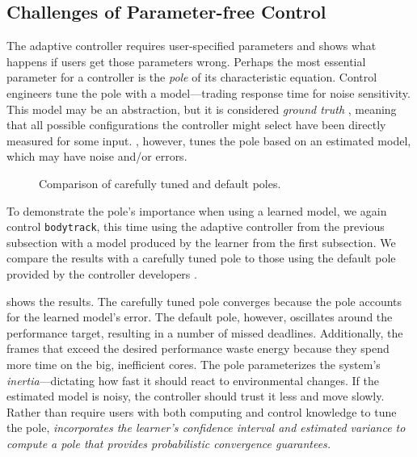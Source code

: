 \subsection{Challenges of Parameter-free Control}
The adaptive controller requires user-specified parameters and
 shows what happens if users get those
parameters wrong. Perhaps the most essential parameter for a
controller is the \emph{pole} of its characteristic equation.  Control
engineers tune the pole with a model---trading response time for noise
sensitivity.  This model may be an abstraction, but it is considered
\emph{ground truth} \cite{Hellerstein2004a}, meaning that all possible
configurations the controller might select have been directly measured
for some input.  \SYSTEM{}, however, tunes the pole based on an
estimated model, which may have noise and/or errors.



\begin{figure}
\centering

\caption{Comparison of carefully tuned and default poles.}
\label{fig:not-simple}
\end{figure}
To demonstrate the pole's importance when using a learned model, we
again control \texttt{bodytrack}, this time using the adaptive
controller from the previous subsection with a model produced by the
learner from the first subsection.  We compare the results with a
carefully tuned pole to those using the default pole provided by the
controller developers \cite{POET}.

 shows the results.  The carefully tuned pole
converges because the pole accounts for the learned model's error. The
default pole, however, oscillates around the performance target,
resulting in a number of missed deadlines.  Additionally, the frames
that exceed the desired performance waste energy because they spend
more time on the big, inefficient cores. The pole parameterizes the
system's \emph{inertia}---dictating how fast it should react to
environmental changes.  If the estimated model is noisy, the
controller should trust it less and move slowly. Rather than require
users with both computing and control knowledge to tune the pole,
\emph{\SYSTEM{} incorporates the learner's confidence interval and
  estimated variance to compute a pole that provides probabilistic
  convergence guarantees.}



